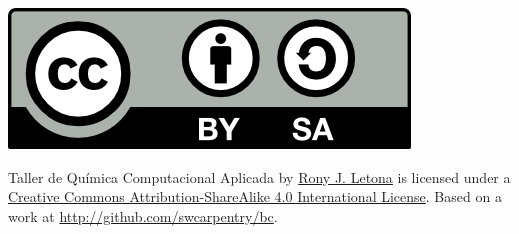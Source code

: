 \documentclass[10pt,letterpaper]{article}
\begin{document}
\noindent \includegraphics{img/cc_big.png}

\noindent Taller de Qu\'imica Computacional Aplicada by \href{http://github.com/zronyj/TQCA}{Rony J. Letona} is licensed under a \href{http://creativecommons.org/licenses/by-sa/4.0/}{Creative Commons Attribution-ShareAlike 4.0 International License}.
Based on a work at \url{http://github.com/swcarpentry/bc}.
\end{document}
